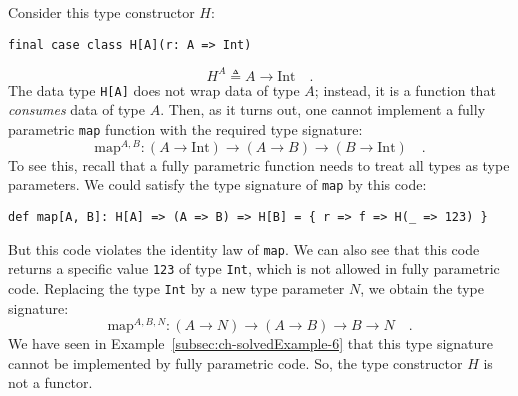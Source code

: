 Consider this type constructor $H$:
\begin{lstlisting}
final case class H[A](r: A => Int)
\end{lstlisting}
\[
H^{A}\triangleq A\rightarrow\text{Int}\quad.
\]
The data type \lstinline!H[A]! does not wrap data of type $A$; instead,
it is a function that \emph{consumes} data of type $A$. Then, as
it turns out, one cannot implement a fully parametric \lstinline!map!
function with the required type signature:
\[
\text{map}^{A,B}:\left(A\rightarrow\text{Int}\right)\rightarrow\left(A\rightarrow B\right)\rightarrow\left(B\rightarrow\text{Int}\right)\quad.
\]
To see this, recall that a fully parametric
function needs to treat all types as type parameters. We could satisfy
the type signature of \lstinline!map! by this code:
\begin{lstlisting}
def map[A, B]: H[A] => (A => B) => H[B] = { r => f => H(_ => 123) }
\end{lstlisting}
But this code violates the identity law of \lstinline!map!. We can
also see that this code returns a specific value \lstinline!123!
of type \lstinline!Int!, which is not allowed in fully parametric
code. Replacing the type \lstinline!Int! by a new type parameter
$N$, we obtain the type signature:
\[
\text{map}^{A,B,N}:\left(A\rightarrow N\right)\rightarrow\left(A\rightarrow B\right)\rightarrow B\rightarrow N\quad.
\]
We have seen in Example~\ref{subsec:ch-solvedExample-6} that this
type signature cannot be implemented by fully parametric code. So,
the type constructor $H$ is not a functor.

